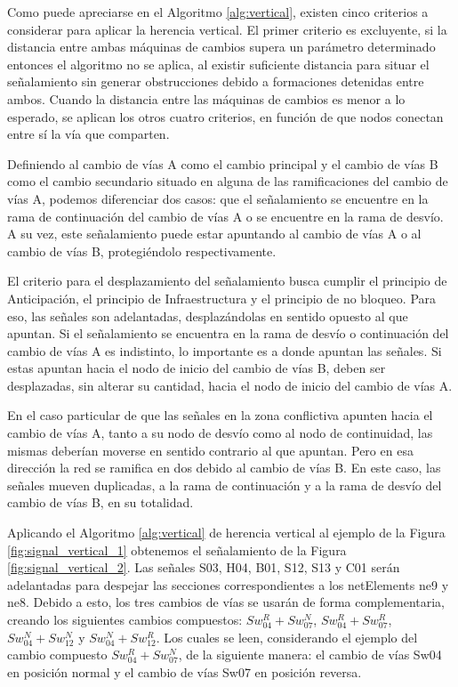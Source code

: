     Como puede apreciarse en el Algoritmo \ref{alg:vertical}, existen cinco criterios a considerar para aplicar la herencia vertical. El primer criterio es excluyente, si la distancia entre ambas máquinas de cambios supera un parámetro determinado entonces el algoritmo no se aplica, al existir suficiente distancia para situar el señalamiento sin generar obstrucciones debido a formaciones detenidas entre ambos. Cuando la distancia entre las máquinas de cambios es menor a lo esperado, se aplican los otros cuatro criterios, en función de que nodos conectan entre sí la vía que comparten.
    
    Definiendo al cambio de vías A como el cambio principal y el cambio de vías B como el cambio secundario situado en alguna de las ramificaciones del cambio de vías A, podemos diferenciar dos casos: que el señalamiento se encuentre en la rama de continuación del cambio de vías A o se encuentre en la rama de desvío. A su vez, este señalamiento puede estar apuntando al cambio de vías A o al cambio de vías B, protegiéndolo respectivamente. 
    
    El criterio para el desplazamiento del señalamiento busca cumplir el principio de Anticipación, el principio de Infraestructura y el principio de no bloqueo. Para eso, las señales son adelantadas, desplazándolas en sentido opuesto al que apuntan. Si el señalamiento se encuentra en la rama de desvío o continuación del cambio de vías A es indistinto, lo importante es a donde apuntan las señales. Si estas apuntan hacia el nodo de inicio del cambio de vías B, deben ser desplazadas, sin alterar su cantidad, hacia el nodo de inicio del cambio de vías A. 
    
    En el caso particular de que las señales en la zona conflictiva apunten hacia el cambio de vías A, tanto a su nodo de desvío como al nodo de continuidad, las mismas deberían moverse en sentido contrario al que apuntan. Pero en esa dirección la red se ramifica en dos debido al cambio de vías B. En este caso, las señales mueven duplicadas, a la rama de continuación y a la rama de desvío del cambio de vías B, en su totalidad.
    
    Aplicando el Algoritmo \ref{alg:vertical} de herencia vertical al ejemplo de la Figura \ref{fig:signal_vertical_1} obtenemos el señalamiento de la Figura \ref{fig:signal_vertical_2}. Las señales S03, H04, B01, S12, S13 y C01 serán adelantadas para despejar las secciones correspondientes a los netElements ne9 y ne8. Debido a esto, los tres cambios de vías se usarán de forma complementaria, creando los siguientes cambios compuestos: $Sw_{04}^R+Sw_{07}^N$, $Sw_{04}^R+Sw_{07}^R$, $Sw_{04}^N+Sw_{12}^N$ y $Sw_{04}^N+Sw_{12}^R$. Los cuales se leen, considerando el ejemplo del cambio compuesto $Sw_{04}^R+Sw_{07}^N$, de la siguiente manera: el cambio de vías Sw04 en posición normal y el cambio de vías Sw07 en posición reversa.
    
